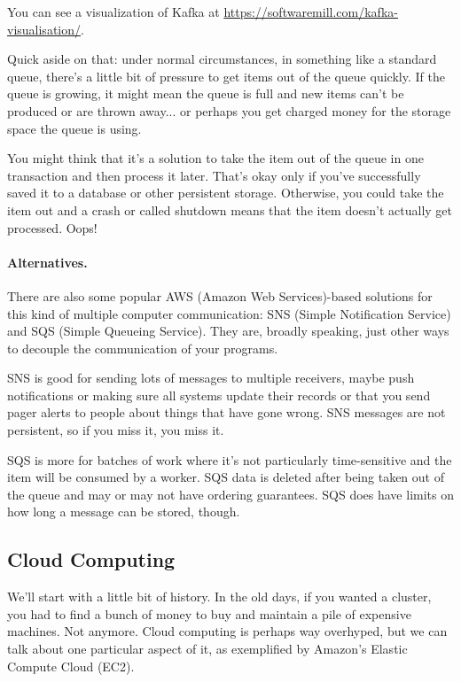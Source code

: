 You can see a visualization of Kafka at \href{https://softwaremill.com/kafka-visualisation/}{https://softwaremill.com/kafka-visualisation/}.

Quick aside on that: under normal circumstances, in something like a standard queue, there's a little bit of pressure to get items out of the queue quickly. If the queue is growing, it might mean the queue is full and new items can't be produced or are thrown away... or perhaps you get charged money for the storage space the queue is using. 

You might think that it's a solution to take the item out of the queue in one transaction and then process it later. That's okay only if you've successfully saved it to a database or other persistent storage. Otherwise, you could take the item out and a crash or called shutdown means that the item doesn't actually get processed. Oops!

\paragraph{Alternatives.} There are also some popular AWS (Amazon Web Services)-based solutions for this kind of multiple computer communication: SNS (Simple Notification Service) and SQS (Simple Queueing Service). They are, broadly speaking, just other ways to decouple the communication of your programs.

SNS is good for sending lots of messages to multiple receivers, maybe push notifications or making sure all systems update their records or that you send pager alerts to people about things that have gone wrong. SNS messages are not persistent, so if you miss it, you miss it. 

SQS is more for batches of work where it's not particularly time-sensitive and the item will be consumed by a worker. SQS data is deleted after being taken out of the queue and may or may not have ordering guarantees. SQS does have limits on how long a message can be stored, though. 

\subsection*{Cloud Computing}
We'll start with a little bit of history.
In the old days, if you wanted a cluster, you had to find a bunch of
money to buy and maintain a pile of expensive machines. Not anymore.
Cloud computing is perhaps way overhyped, but we can talk about 
one particular aspect of it, as exemplified by Amazon's Elastic
Compute Cloud (EC2).

